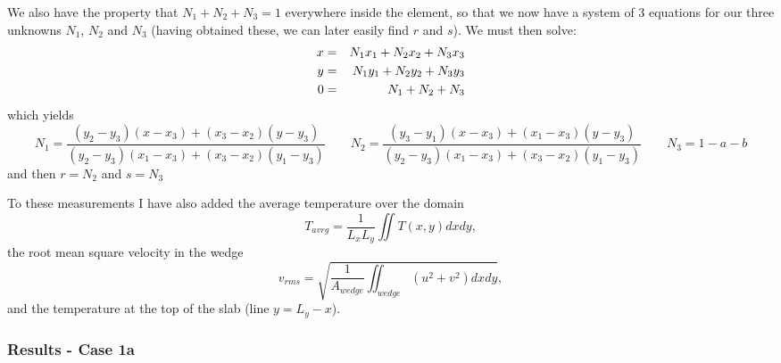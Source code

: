 We also have the property that $N_1+N_2+N_3=1$ everywhere inside the element, so that 
we now have a system of 3 equations for our three unknowns $N_1$, $N_2$ and $N_3$ (having
obtained these, we can later easily find $r$ and $s$).
We must then solve:
\begin{eqnarray}
x &=& N_1 x_1 + N_2 x_2 + N_3 x_3 \nonumber\\  
y &=& N_1 y_1 + N_2 y_2 + N_3 y_3 \nonumber\\
0 &=& N_1+N_2+N_3 \nonumber
\end{eqnarray}
which yields
\[
N_1=\frac{(y_2 - y_3)(x - x_3) + (x_3 - x_2)(y - y_3)}{(y_2 - y_3)(x_1 - x_3) + (x_3 - x_2)(y_1 - y_3)}
\qquad
N_2=\frac{(y_3 - y_1)(x - x_3) + (x_1 - x_3)(y - y_3)}{(y_2 - y_3)(x_1 - x_3) + (x_3 - x_2)(y_1 - y_3)}
\qquad
N_3=1-a-b
\]
and then $r=N_2$ and $s=N_3$

To these measurements I have also added the average temperature over the domain 
\[
T_{avrg} = \frac{1}{L_xL_y}\iint T(x,y) dx dy,
\]
the root mean square velocity in the wedge
\[
v_{rms} = \sqrt{  \frac{1}{A_{wedge}} \iint_{wedge} (u^2+v^2) dx dy    },
\]
and the temperature at the top of the slab (line $y=L_y-x$).



\newpage
\subsubsection*{Results - Case 1a} 

